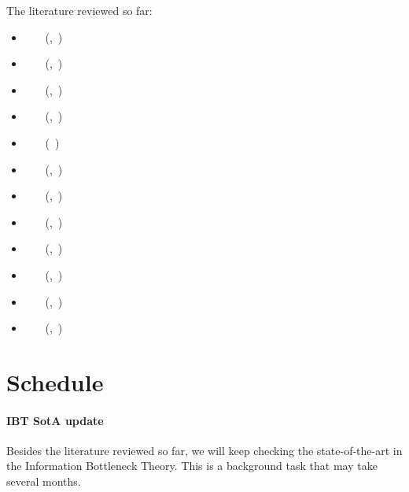 The literature reviewed so far:
\begin{itemize}
	\item~~\cite{tishby:2015dlib} ~(\citeauthor{tishby:2015dlib},~\citeyear{tishby:2015dlib})
	\item~~\cite{shwartz-ziv:2017} ~(\citeauthor{shwartz-ziv:2017},~\citeyear{shwartz-ziv:2017})
	\item~~\cite{achille:2017emergence} ~(\citeauthor{achille:2017emergence},~\citeyear{achille:2017emergence})
	\item~~\cite{zaslavsky:2018} ~(\citeauthor{zaslavsky:2018},~\citeyear{zaslavsky:2018})
	\item~~\cite{achille:2018critical} ~(\citeauthor{achille:2018critical}~\citeyear{achille:2018critical})
	\item~~\cite{achille:2018infodropout} ~(\citeauthor{achille:2018infodropout},~\citeyear{achille:2018infodropout})
	\item~~\cite{achille:2018dynamics} ~(\citeauthor{achille:2018dynamics},~\citeyear{achille:2018dynamics})
	\item~~\cite{achille:2019complexity} ~(\citeauthor{achille:2019complexity},~\citeyear{achille:2019complexity})
	\item~~\cite{shwartz-ziv:2019} ~(\citeauthor{shwartz-ziv:2019},~\citeyear{shwartz-ziv:2019})
	\item~~\cite{saxe:2019} ~(\citeauthor{saxe:2019},~\citeyear{saxe:2019})
	\item~~\cite{achille:2019weights} ~(\citeauthor{achille:2019weights},~\citeyear{achille:2019weights})
	\item~~\cite{achille:2019phd} ~(\citeauthor{achille:2019phd},~\citeyear{achille:2019phd})
\end{itemize}


\section{Schedule}
\paragraph{IBT SotA update} Besides the literature reviewed so far, we will keep checking the state-of-the-art in the Information Bottleneck Theory. This is a background task that may take several months.
